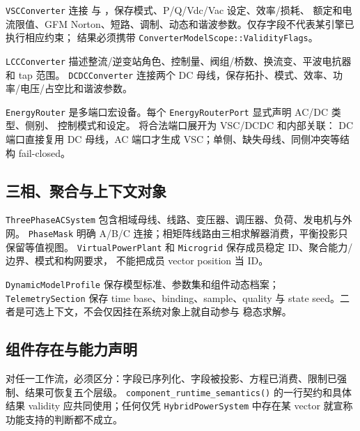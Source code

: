 \texttt{VSCConverter} 连接  与 ，保存模式、P/Q/Vdc/Vac 设定、效率/损耗、
额定和电流限值、GFM Norton、短路、调制、动态和谐波参数。仅存字段不代表某引擎已执行相应约束；
结果必须携带 \texttt{ConverterModelScope::ValidityFlags}。

\texttt{LCCConverter} 描述整流/逆变站角色、控制量、阀组/桥数、换流变、平波电抗器和 tap 范围。
\texttt{DCDCConverter} 连接两个 DC 母线，保存拓扑、模式、效率、功率/电压/占空比和谐波参数。

\texttt{EnergyRouter} 是多端口宏设备。每个 \texttt{EnergyRouterPort} 显式声明 AC/DC 类型、侧别、
控制模式和设定。 将合法端口展开为 VSC/DCDC 和内部关联：
DC 端口直接复用 DC 母线，AC 端口才生成 VSC；单侧、缺失母线、同侧冲突等结构 fail-closed。

\subsection{三相、聚合与上下文对象}

\texttt{ThreePhaseACSystem} 包含相域母线、线路、变压器、调压器、负荷、发电机与外网。
\texttt{PhaseMask} 明确 A/B/C 连接；相矩阵线路由三相求解器消费，平衡投影只保留等值视图。
\texttt{VirtualPowerPlant} 和 \texttt{Microgrid} 保存成员稳定 ID、聚合能力/边界、模式和构网要求，
不能把成员 vector position 当 ID。

\texttt{DynamicModelProfile} 保存模型标准、参数集和组件动态档案；\texttt{TelemetrySection} 保存
time base、binding、sample、quality 与 state seed。二者是可选上下文，不会仅因挂在系统对象上就自动参与
稳态求解。

\subsection{组件存在与能力声明}

对任一工作流，必须区分：字段已序列化、字段被投影、方程已消费、限制已强制、结果可恢复五个层级。
\texttt{component\_runtime\_semantics()} 的一行契约和具体结果 validity 应共同使用；任何仅凭
\texttt{HybridPowerSystem} 中存在某 vector 就宣称功能支持的判断都不成立。

